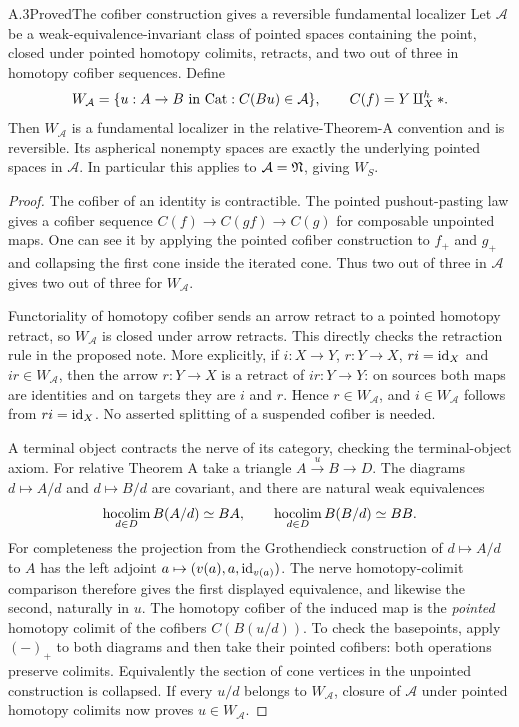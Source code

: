 \begin{claim}{A.3}{Proved}{The cofiber construction gives a reversible fundamental localizer}\label{A3}
Let $\mathcal A$ be a weak-equivalence-invariant class of pointed spaces containing the point, closed under pointed homotopy colimits, retracts, and two out of three in homotopy cofiber sequences. Define
\[
 W_{\mathcal A}=\{u:A\to B\text{ in }\mathrm{Cat}:C(Bu)\in\mathcal A\},
 \qquad C(f)=Y\amalg_X^h *.
\]
Then $W_{\mathcal A}$ is a fundamental localizer in the relative-Theorem-A convention and is reversible. Its aspherical nonempty spaces are exactly the underlying pointed spaces in $\mathcal A$. In particular this applies to $\mathcal A=\mathfrak N$, giving $W_S$.
\end{claim}
\begin{proof}
The cofiber of an identity is contractible. The pointed pushout-pasting law gives a cofiber sequence
$C(f)\to C(gf)\to C(g)$ for composable unpointed maps. One can see it by applying the pointed cofiber construction to $f_+$ and $g_+$ and collapsing the first cone inside the iterated cone. Thus two out of three in $\mathcal A$ gives two out of three for $W_{\mathcal A}$.

Functoriality of homotopy cofiber sends an arrow retract to a pointed homotopy retract, so $W_{\mathcal A}$ is closed under arrow retracts. This directly checks the retraction rule in the proposed note. More explicitly, if $i:X\to Y$, $r:Y\to X$, $ri=\mathrm{id}_X$ and $ir\in W_{\mathcal A}$, then the arrow $r:Y\to X$ is a retract of $ir:Y\to Y$: on sources both maps are identities and on targets they are $i$ and $r$. Hence $r\in W_{\mathcal A}$, and $i\in W_{\mathcal A}$ follows from $ri=\mathrm{id}_X$. No asserted splitting of a suspended cofiber is needed.

A terminal object contracts the nerve of its category, checking the terminal-object axiom. For relative Theorem A take a triangle $A\xrightarrow{u}B\to D$. The diagrams $d\mapsto A/d$ and $d\mapsto B/d$ are covariant, and there are natural weak equivalences
\[
 \operatorname*{hocolim}_{d\in D}B(A/d)\simeq BA,
 \qquad \operatorname*{hocolim}_{d\in D}B(B/d)\simeq BB.
\]
For completeness the projection from the Grothendieck construction of $d\mapsto A/d$ to $A$ has the left adjoint $a\mapsto(v(a),a,\mathrm{id}_{v(a)})$. The nerve homotopy-colimit comparison therefore gives the first displayed equivalence, and likewise the second, naturally in $u$. The homotopy cofiber of the induced map is the \emph{pointed} homotopy colimit of the cofibers $C(B(u/d))$. To check the basepoints, apply $(-)_+$ to both diagrams and then take their pointed cofibers: both operations preserve colimits. Equivalently the section of cone vertices in the unpointed construction is collapsed. If every $u/d$ belongs to $W_{\mathcal A}$, closure of $\mathcal A$ under pointed homotopy colimits now proves $u\in W_{\mathcal A}$.


\end{proof}
